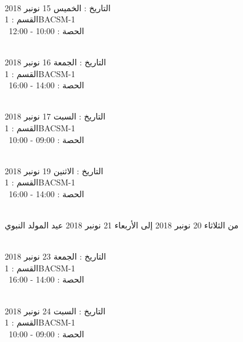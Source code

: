 \par
\noindent\makebox[\linewidth]{\rule{\paperwidth}{0.4pt}}
 \\
التاريخ : الخميس 15 نونبر 2018 \\
القسم : 1BACSM-1 \\
 \  
الحصة : 10:00 - 12:00 \\
\par
\noindent\makebox[\linewidth]{\rule{\paperwidth}{0.4pt}}
 \\
التاريخ : الجمعة 16 نونبر 2018 \\
القسم : 1BACSM-1 \\
 \  
الحصة : 14:00 - 16:00 \\
\par
\noindent\makebox[\linewidth]{\rule{\paperwidth}{0.4pt}}
 \\
التاريخ : السبت 17 نونبر 2018 \\
القسم : 1BACSM-1 \\
 \  
الحصة : 09:00 - 10:00 \\
\par
\noindent\makebox[\linewidth]{\rule{\paperwidth}{0.4pt}}
 \\
التاريخ : الاثنين 19 نونبر 2018 \\
القسم : 1BACSM-1 \\
 \  
الحصة : 14:00 - 16:00 \\
\par
\noindent\makebox[\linewidth]{\rule{\paperwidth}{0.4pt}}
 \\
من الثلاثاء 20 نونبر 2018 إلى الأربعاء 21 نونبر 2018
\newline
\indent
  عيد المولد النبوي
\par
\noindent\makebox[\linewidth]{\rule{\paperwidth}{0.4pt}}
 \\
التاريخ : الجمعة 23 نونبر 2018 \\
القسم : 1BACSM-1 \\
 \  
الحصة : 14:00 - 16:00 \\
\par
\noindent\makebox[\linewidth]{\rule{\paperwidth}{0.4pt}}
 \\
التاريخ : السبت 24 نونبر 2018 \\
القسم : 1BACSM-1 \\
 \  
الحصة : 09:00 - 10:00 \\
